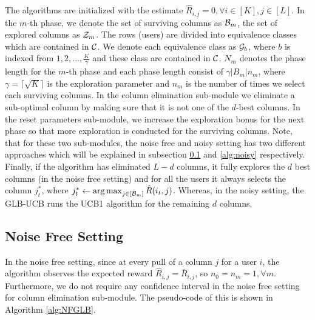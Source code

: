The algorithms are initialized with the estimate $\hat{R}_{i,j}=0, \forall i\in[K], j\in[L]$. In the $m$-th phase, we denote the set of surviving columns as $\mathcal{B}_m$, the set of explored columns as $\mathcal{Z}_m$. The rows (users) are divided into equivalence classes which are contained in $\mathcal{C}$. We denote each equivalence class as $\mathcal{G}_b$, where $b$ is indexed from $1,2,\ldots , \frac{K}{\gamma}$ and these class are contained in $\mathcal{C}$.  $N_m$ denotes the phase length for the $m$-th phase and each phase length consist of $\gamma |B_m| n_m $, where $ \gamma = \lceil\sqrt{K} \rceil $ is the exploration parameter and $ n_m $ is the number of times we select each surviving columns. In the column elimination sub-module we eliminate a sub-optimal column by making sure that it is not one of the $d$-best columns. In the reset parameters sub-module, we increase the exploration bonus for the next phase so that more exploration is conducted for the surviving columns. Note, that for these two sub-modules, the noise free and noisy setting has two different approaches which will be explained in subsection \ref{alg:noisefree} and \ref{alg:noisy} respectively. Finally, if the algorithm has eliminated $L-d$ columns, it fully explores the $d$ best columns (in the noise free setting) and for all the users it always selects the column $j^*_t$, where $j_t^* \leftarrow \mathop{\rm arg\,max}_{j\in[\mathcal{B}_m]} {\hat{R}(i_t,j)}$. Whereas, in the noisy setting, the GLB-UCB runs the UCB1 algorithm for the remaining $d$ columns.

\subsection{Noise Free Setting}
\label{alg:noisefree}

In the noise free setting, since at every pull of a column $j$ for a user $i$, the algorithm observes the expected reward $\hat{R}_{i,j} = \bar{R}_{i,j}$, so $n_0 =  n_m = 1, \forall m$. Furthermore, we do not require any confidence interval in the noise free setting for column elimination sub-module. The pseudo-code of this is shown in Algorithm \ref{alg:NFGLB}.


